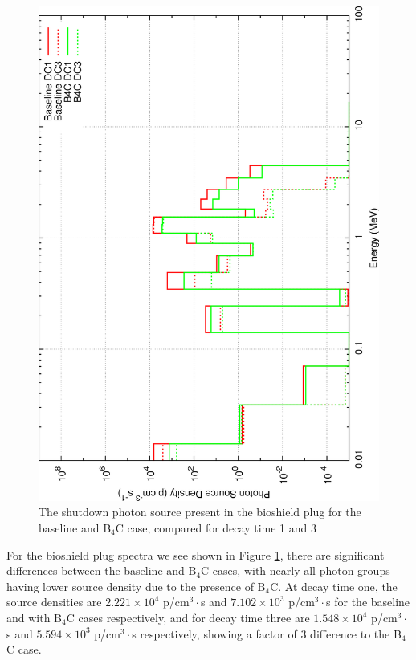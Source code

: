 \documentclass[12pt]{article}
\begin{document}
\newpage
\clearpage
\begin{figure}[ht!]
  \centering
  \includegraphics[angle=-90,clip,scale=0.15]{../plots/source_comparison/bioshield_spectra.png}     
  \caption{The shutdown photon source present in the bioshield plug for the baseline and B$_4$C case, compared 
  for decay time 1 and 3}
  \label{fig:src_spectra_bioshield}
\end{figure}

For the bioshield plug spectra we see shown in Figure \ref{fig:src_spectra_bioshield}, 
there are significant differences between the baseline and B$_4$C cases, with nearly all 
photon groups having lower source density due to the presence of B$_4$C.  At decay time one, the 
source densities are $2.221\times10^4$ p/cm$^3\cdot$s and  $7.102\times10^3$ p/cm$^3\cdot$s for the
baseline and with B$_4$C cases respectively, and for decay time three are  
$1.548\times10^4$ p/cm$^3\cdot$s and $5.594\times10^3$ p/cm$^3\cdot$s respectively, showing a factor of 3 
difference to the B$_4$C case.
\end{document}
